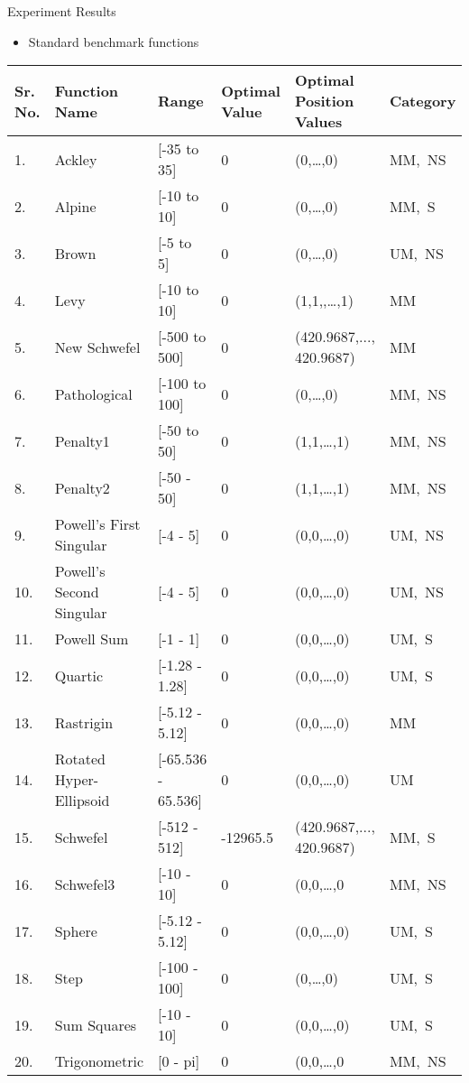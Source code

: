 \documentclass [9pt,times] {beamer}
\begin{document}
\begin{frame}[fragile]{Experiment Results}
\begin{itemize}
\fontsize{7pt}{9pt}\selectfont
\item Standard benchmark functions
\end{itemize}
\begin{table}
\tiny
\renewcommand{\arraystretch}{1.5}
\vspace{-0.25cm}
  \begin{tabular}{p{0.06in} p{0.9in}  p{0.8in} p{0.3in} p{0.9in} p{0.5in}}
    \hline
\textbf{Sr. No.}  &\textbf{Function Name}	&				\textbf{Range }	 & \textbf{Optimal Value} &\textbf{Optimal Position Values }&\textbf{Category}\\
\hline

1.	&	Ackley	&		[-35 to 35]	&	 0	&	 (0,\dots,0) & MM,\ NS\\
2.	&	Alpine	&		[-10 to 10] 	&	0	&	 (0,\dots,0)& MM,\ S\\
3.	&	Brown	&	[-5 to 5] &	0	&	(0,\dots,0)& UM,\ NS\\
4.	&	Levy	&	[-10 to 10] 	&	 0	&	 (1,1,,\dots,1)& MM\\
5.	&	New Schwefel	&		[-500 to 500]	 &	0	&	 (420.9687,..., 420.9687)& MM\\
6.    &	Pathological	&		[-100 to 100]	 &	0	&	(0,\dots,0)& MM,\ NS\\
7.	&	Penalty1	&		 [-50 to 50]	&	 0	&	(1,1,\dots,1)	& MM,\ NS\\
8.	&	Penalty2	&	 	[-50 - 50]		& 0	&	  (1,1,\dots,1) &MM,\ NS\\
9.	&	Powell's First Singular	&		[-4 - 5]	&	0	 &	(0,0,\dots,0)& UM,\ NS\\
10.	&	Powell's Second Singular	&		[-4 - 5]	&	0	&	 (0,0,\dots,0) & UM,\ NS\\
11.	&	Powell Sum	&		[-1 - 1]	&	0	 &	(0,0,\dots,0)	& UM,\ S\\
12.	&	Quartic	&		[-1.28 - 1.28]	&	0	&	(0,0,\dots,0)	& UM,\ S\\
13.	&	Rastrigin	&		[-5.12 - 5.12]	&	0	&	 (0,0,\dots,0)	& MM\\
14.	&	Rotated Hyper-Ellipsoid	&		[-65.536 - 65.536] 	&	0	&	 (0,0,\dots,0)	& UM\\
15.	&	Schwefel	&		[-512 - 512]	&	-12965.5	 &		 (420.9687,..., 420.9687)& MM,\ S\\
16.	&	Schwefel3	&	[-10 - 10] 	&	 0	&	 (0,0,\dots,0& MM,\ NS \\
17.	&	Sphere	&		[-5.12 - 5.12]	&	0	&(0,0,\dots,0)	& UM,\ S\\
18. &	Step	&		[-100 - 100]	&	 0	&	 (0,\dots,0)& UM,\ S\\
19.	&	Sum Squares	&		[-10 - 10] 	&	0 &	(0,0,\dots,0)	& UM,\ S\\
20.	&	Trigonometric	&		[0 - pi]	&	 0	&	 (0,0,\dots,0& MM,\ NS \\
\hline
\end{tabular}
\end{table}

\end{frame}
\end{document}
